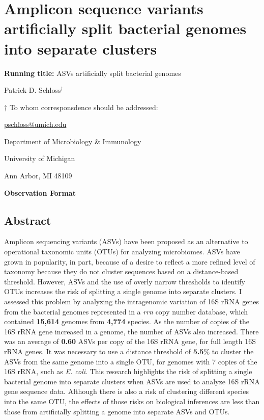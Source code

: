 \documentclass[
]{article}
\author{}
\date{\vspace{-2.5em}}
\begin{document}
\hypertarget{amplicon-sequence-variants-artificially-split-bacterial-genomes-into-separate-clusters}{%
\section{Amplicon sequence variants artificially split bacterial genomes
into separate
clusters}\label{amplicon-sequence-variants-artificially-split-bacterial-genomes-into-separate-clusters}}

\vspace{20mm}

\textbf{Running title:} ASVs artificially split bacterial genomes

\vspace{20mm}

Patrick D. Schloss\({^\dagger}\)

\vspace{40mm}

\({\dagger}\) To whom corresponsdence should be addressed:

\href{mailto:pschloss@umich.edu}{pschloss@umich.edu}

Department of Microbiology \& Immunology

University of Michigan

Ann Arbor, MI 48109

\vspace{20mm}

\textbf{Observation Format}

\newpage

\hypertarget{abstract}{%
\subsection{Abstract}\label{abstract}}

Amplicon sequencing variants (ASVs) have been proposed as an alternative
to operational taxonomic units (OTUs) for analyzing microbiomes. ASVs
have grown in popularity, in part, because of a desire to reflect a more
refined level of taxonomy because they do not cluster sequences based on
a distance-based threshold. However, ASVs and the use of overly narrow
thresholds to identify OTUs increases the risk of splitting a single
genome into separate clusters. I assessed this problem by analyzing the
intragenomic variation of 16S rRNA genes from the bacterial genomes
represented in a \emph{rrn} copy number database, which contained
\textbf{15,614} genomes from \textbf{4,774} species. As the number of
copies of the 16S rRNA gene increased in a genome, the number of ASVs
also increased. There was an average of \textbf{0.60} ASVs per copy of
the 16S rRNA gene, for full length 16S rRNA genes. It was necessary to
use a distance threshold of \textbf{5.5}\% to cluster the ASVs from the
same genome into a single OTU, for genomes with 7 copies of the 16S
rRNA, such as \emph{E. coli}. This research highlights the risk of
splitting a single bacterial genome into separate clusters when ASVs are
used to analyze 16S rRNA gene sequence data. Although there is also a
risk of clustering different species into the same OTU, the effects of
those risks on biological inferences are less than those from
artificially splitting a genome into separate ASVs and OTUs.
\end{document}
